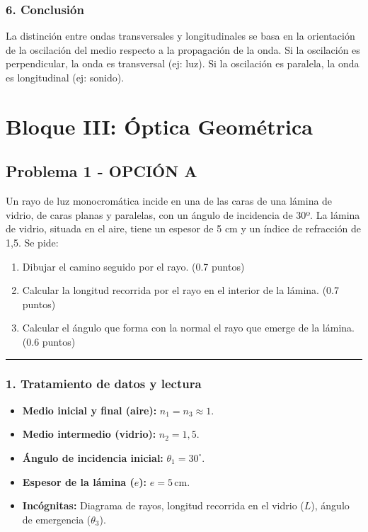 \subsubsection*{6. Conclusión}
\begin{cajaconclusion}
La distinción entre ondas transversales y longitudinales se basa en la orientación de la oscilación del medio respecto a la propagación de la onda. Si la oscilación es perpendicular, la onda es transversal (ej: luz). Si la oscilación es paralela, la onda es longitudinal (ej: sonido).
\end{cajaconclusion}

\newpage
\section{Bloque III: Óptica Geométrica}
\label{sec:optica_2001_jun_ord}

\subsection{Problema 1 - OPCIÓN A}
\label{subsec:3A_2001_jun_ord}

\begin{cajaenunciado}
Un rayo de luz monocromática incide en una de las caras de una lámina de vidrio, de caras planas y paralelas, con un ángulo de incidencia de 30º. La lámina de vidrio, situada en el aire, tiene un espesor de 5 cm y un índice de refracción de 1,5. Se pide:
\begin{enumerate}
    \item Dibujar el camino seguido por el rayo. (0.7 puntos)
    \item Calcular la longitud recorrida por el rayo en el interior de la lámina. (0.7 puntos)
    \item Calcular el ángulo que forma con la normal el rayo que emerge de la lámina. (0.6 puntos)
\end{enumerate}
\end{cajaenunciado}
\hrule

\subsubsection*{1. Tratamiento de datos y lectura}
\begin{itemize}
    \item \textbf{Medio inicial y final (aire):} $n_1 = n_3 \approx 1$.
    \item \textbf{Medio intermedio (vidrio):} $n_2 = 1,5$.
    \item \textbf{Ángulo de incidencia inicial:} $\theta_1 = 30^\circ$.
    \item \textbf{Espesor de la lámina ($e$):} $e = 5 \, \text{cm}$.
    \item \textbf{Incógnitas:} Diagrama de rayos, longitud recorrida en el vidrio ($L$), ángulo de emergencia ($\theta_3$).
\end{itemize}

